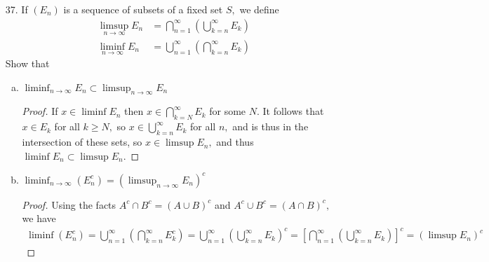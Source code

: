 \documentclass{article}
\begin{document}
\begin{itemize}
\begin{enumerate}[(a)]
			\item $\min\left\{ a, b \right\} = \frac{1}{2} (a+b-\abs{a-b})$
				\begin{proof}
					\begin{align*}
						a\ge b&\implies\frac{1}{2}(a+b-\abs{a-b}) = \frac{1}{2}(a+b-(a-b)) = b = \min\left\{ a, b \right\} \\
						a<b &\implies \frac{1}{2}(a+b-\abs{a-b}) = \frac{1}{2}(a+b+(a-b)) = a = \min\left\{ a, b \right\}
					\end{align*}
				\end{proof}

		\end{enumerate}

	\item[37.] If $(E_n)$ is a sequence of subsets of a fixed set $S,$ we define
		\begin{align*}
			\limsup_{n\to\infty} E_n &=\bigcap_{n=1}^\infty\left( \bigcup_{k=n}^\infty E_k \right) \\
			\liminf_{n\to\infty} E_n &= \bigcup_{n=1}^\infty\left( \bigcap_{k=n}^\infty E_k \right)
		\end{align*}
		Show that
		\begin{enumerate}[(a)]
			\item $\displaystyle\liminf_{n\to\infty}E_n \subset \limsup_{n\to\infty} E_n$
				\begin{proof}
					If $x\in\liminf E_n$ then $x\in\bigcap_{k=N}^\infty E_k$ for some $N.$ It follows that $x\in E_k$ for all $k\ge N,$ so $x\in\bigcup_{k=n}^\infty E_k$ for all $n,$ and is thus in the intersection of these sets, so $x\in \limsup E_n,$ and thus $\liminf E_n\subset\limsup E_n.$
				\end{proof}

			\item $\displaystyle\liminf_{n\to\infty}(E_n^c) = \left( \limsup_{n\to\infty} E_n \right)^c$
				\begin{proof}
					Using the facts $A^c\cap B^c = (A\cup B)^c$ and $A^c\cup B^c = (A\cap B)^c,$ we have
					\begin{align*}
						\liminf(E_n^c)=\bigcup_{n=1}^\infty\left( \bigcap_{k=n}^\infty E_k^c \right) = \bigcup_{n=1}^\infty\left( \bigcup_{k=n}^\infty E_k \right)^c = \left[ \bigcap_{n=1}^\infty \left( \bigcup_{k=n}^\infty E_k \right) \right]^c = \left( \limsup E_n \right)^c
					\end{align*}
				\end{proof}

		\end{enumerate}


\end{itemize}
\end{document}
